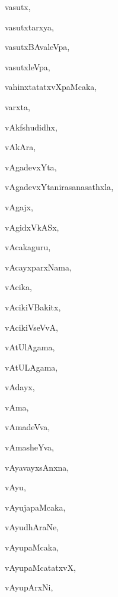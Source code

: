 \begin{multicols}{3}
{\noindent
{vasutx}, \pageref{vasutx}

\noindent
{vasutxtarxya}, \pageref{vasutxtarxya}

\noindent
{vasutxBAvaleVpa}, \pageref{vasutxBAvaleVpa}

\noindent
{vasutxleVpa}, \pageref{vasutxleVpa}

\noindent
{vahinxtatatxvXpaMcaka}, \pageref{vahinxtatatxvXpaMcaka}

\noindent
{varxta}, \pageref{varxta}

\noindent
{vAkfshudidhx}, \pageref{vAkfshudidhx}

\noindent
{vAkAra}, \pageref{vAkAra}

\noindent
{vAgadevxYta}, \pageref{vAgadevxYta}

\noindent
{vAgadevxYtanirasanasathxla}, \pageref{vAgadevxYtanirasanasathxla}

\noindent
{vAgajx}, \pageref{vAgajx}

\noindent
{vAgidxVkASx}, \pageref{vAgidxVkASx}

\noindent
{vAcakaguru}, \pageref{vAcakaguru}

\noindent
{vAcayxparxNama}, \pageref{vAcayxparxNama}

\noindent
{vAcika}, \pageref{vAcika}

\noindent
{vAcikiVBakitx}, \pageref{vAcikiVBakitx}

\noindent
{vAcikiVseVvA}, \pageref{vAcikiVseVvA}

\noindent
{vAtUlAgama}, \pageref{vAtUlAgama}

\noindent
{vAtULAgama}, \pageref{vAtULAgama}

\noindent
{vAdayx}, \pageref{vAdayx}

\noindent
{vAma}, \pageref{vAma}

\noindent
{vAmadeVva}, \pageref{vAmadeVva}

\noindent
{vAmasheYva}, \pageref{vAmasheYva}

\noindent
{vAyavayxsAnxna}, \pageref{vAyavayxsAnxna}

\noindent
{vAyu}, \pageref{vAyu}

\noindent
{vAyujapaMcaka}, \pageref{vAyujapaMcaka}

\noindent
{vAyudhAraNe}, \pageref{vAyudhAraNe}

\noindent
{vAyupaMcaka}, \pageref{vAyupaMcaka}

\noindent
{vAyupaMcatatxvX}, \pageref{vAyupaMcatatxvX}

\noindent
{vAyupArxNi}, \pageref{vAyupArxNi}

}
\end{multicols}

